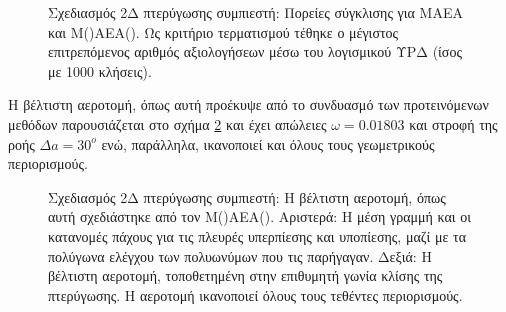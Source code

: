\begin{figure}[h!]
\begin{minipage}[b]{1\linewidth}
 \centering
\end{minipage}
\caption{Σχεδιασμός 2Δ πτερύγωσης συμπιεστή: Πορείες σύγκλισης για ΜΑΕΑ και  Μ()ΑΕΑ(). Ως κριτήριο τερματισμού τέθηκε ο μέγιστος επιτρεπόμενος αριθμός αξιολογήσεων μέσω του λογισμικού ΥΡΔ (ίσος με 1000 κλήσεις).} 
\label{PCADrelaRes}
\end{figure}

Η βέλτιστη αεροτομή, όπως αυτή προέκυψε από το συνδυασμό των προτεινόμενων μεθόδων παρουσιάζεται στο σχήμα \ref{PCADrelaRes2} και έχει απώλειες $\omega\!=\!0.01803$ και στροφή της ροής $\Delta a\!=\!30^o$ ενώ, παράλληλα, ικανοποιεί και όλους τους γεωμετρικούς περιορισμούς.  

\begin{figure}[h!]
\begin{minipage}[b]{1\linewidth}
 \centering
\end{minipage}
\caption{Σχεδιασμός 2Δ πτερύγωσης συμπιεστή: Η βέλτιστη αεροτομή, όπως αυτή σχεδιάστηκε από τον Μ()ΑΕΑ(). Αριστερά: Η μέση γραμμή και οι κατανομές πάχους για τις πλευρές υπερπίεσης και υποπίεσης, μαζί με τα πολύγωνα ελέγχου των πολυωνύμων  που τις παρήγαγαν. Δεξιά: Η βέλτιστη αεροτομή, τοποθετημένη στην επιθυμητή γωνία κλίσης της πτερύγωσης. Η αεροτομή ικανοποιεί όλους τους τεθέντες περιορισμούς.} 
\label{PCADrelaRes2}
\end{figure}

